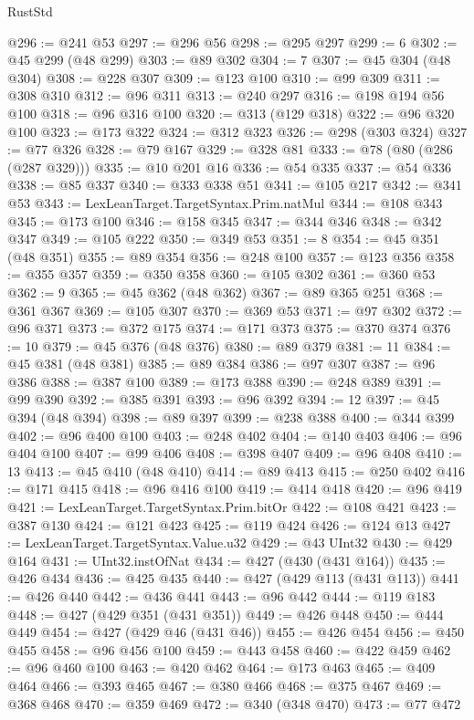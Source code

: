 \begin{lexlean}{RustStd}
\begin{coremodule}
@296 := @241 @53
@297 := @296 @56
@298 := @295 @297
@299 := 6
@302 := @45 @299 (@48 @299)
@303 := @89 @302
@304 := 7
@307 := @45 @304 (@48 @304)
@308 := @228 @307
@309 := @123 @100
@310 := @99 @309
@311 := @308 @310
@312 := @96 @311
@313 := @240 @297
@316 := @198 @194 @56 @100
@318 := @96 @316 @100
@320 := @313 (@129 @318)
@322 := @96 @320 @100
@323 := @173 @322
@324 := @312 @323
@326 := @298 (@303 @324)
@327 := @77 @326
@328 := @79 @167
@329 := @328 @81
@333 := @78 (@80 (@286 (@287 @329)))
@335 := @10 @201 @16
@336 := @54 @335
@337 := @54 @336
@338 := @85 @337
@340 := @333 @338 @51
@341 := @105 @217
@342 := @341 @53
@343 := LexLeanTarget.TargetSyntax.Prim.natMul
@344 := @108 @343
@345 := @173 @100
@346 := @158 @345
@347 := @344 @346
@348 := @342 @347
@349 := @105 @222
@350 := @349 @53
@351 := 8
@354 := @45 @351 (@48 @351)
@355 := @89 @354
@356 := @248 @100
@357 := @123 @356
@358 := @355 @357
@359 := @350 @358
@360 := @105 @302
@361 := @360 @53
@362 := 9
@365 := @45 @362 (@48 @362)
@367 := @89 @365 @251
@368 := @361 @367
@369 := @105 @307
@370 := @369 @53
@371 := @97 @302
@372 := @96 @371
@373 := @372 @175
@374 := @171 @373
@375 := @370 @374
@376 := 10
@379 := @45 @376 (@48 @376)
@380 := @89 @379
@381 := 11
@384 := @45 @381 (@48 @381)
@385 := @89 @384
@386 := @97 @307
@387 := @96 @386
@388 := @387 @100
@389 := @173 @388
@390 := @248 @389
@391 := @99 @390
@392 := @385 @391
@393 := @96 @392
@394 := 12
@397 := @45 @394 (@48 @394)
@398 := @89 @397
@399 := @238 @388
@400 := @344 @399
@402 := @96 @400 @100
@403 := @248 @402
@404 := @140 @403
@406 := @96 @404 @100
@407 := @99 @406
@408 := @398 @407
@409 := @96 @408
@410 := 13
@413 := @45 @410 (@48 @410)
@414 := @89 @413
@415 := @250 @402
@416 := @171 @415
@418 := @96 @416 @100
@419 := @414 @418
@420 := @96 @419
@421 := LexLeanTarget.TargetSyntax.Prim.bitOr
@422 := @108 @421
@423 := @387 @130
@424 := @121 @423
@425 := @119 @424
@426 := @124 @13
@427 := LexLeanTarget.TargetSyntax.Value.u32
@429 := @43 UInt32
@430 := @429 @164
@431 := UInt32.instOfNat
@434 := @427 (@430 (@431 @164))
@435 := @426 @434
@436 := @425 @435
@440 := @427 (@429 @113 (@431 @113))
@441 := @426 @440
@442 := @436 @441
@443 := @96 @442
@444 := @119 @183
@448 := @427 (@429 @351 (@431 @351))
@449 := @426 @448
@450 := @444 @449
@454 := @427 (@429 @46 (@431 @46))
@455 := @426 @454
@456 := @450 @455
@458 := @96 @456 @100
@459 := @443 @458
@460 := @422 @459
@462 := @96 @460 @100
@463 := @420 @462
@464 := @173 @463
@465 := @409 @464
@466 := @393 @465
@467 := @380 @466
@468 := @375 @467
@469 := @368 @468
@470 := @359 @469
@472 := @340 (@348 @470)
@473 := @77 @472

\end{coremodule}
\end{lexlean}
